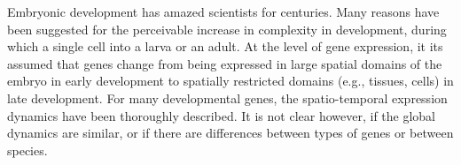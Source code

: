 
Embryonic development has amazed scientists for centuries.
%
Many reasons have been suggested for the perceivable increase in complexity in development, during which a single cell into a larva or an adult.
%
%
At the level of gene expression, 
it its assumed that genes change from being expressed in large spatial domains of the embryo in early development to spatially restricted domains (e.g., tissues, cells) in late development.
%
For many developmental genes, the spatio-temporal expression dynamics
have been thoroughly described.
It is not clear however, if the global dynamics are similar,
or if there are differences between types of genes or between species.

